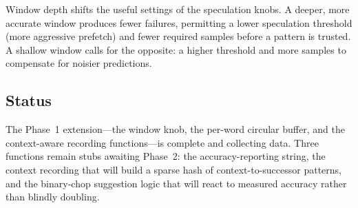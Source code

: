 Window depth shifts the useful settings of the speculation knobs. A deeper, more
accurate window produces fewer failures, permitting a lower speculation
threshold (more aggressive prefetch) and fewer required samples before a pattern
is trusted. A shallow window calls for the opposite: a higher threshold and more
samples to compensate for noisier predictions.

\subsection{Status}

The Phase~1 extension---the window knob, the per-word circular buffer, and the
context-aware recording functions---is complete and collecting data. Three
functions remain stubs awaiting Phase~2: the accuracy-reporting string, the
context recording that will build a sparse hash of context-to-successor
patterns, and the binary-chop suggestion logic that will react to measured
accuracy rather than blindly doubling.

